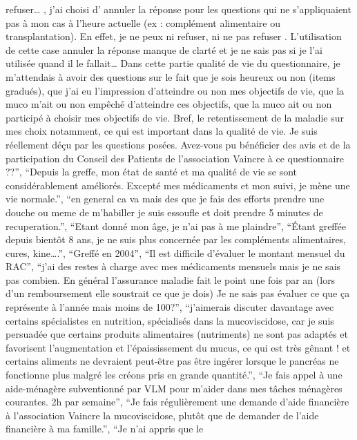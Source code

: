 \documentclass[
  letterpaper,
  DIV=11,
  numbers=noendperiod]{scrartcl}
\begin{document}
\begin{itemize}
  refuser\ldots{} , j'ai choisi d' annuler la réponse pour les questions
  qui ne s'appliquaient pas à mon cas à l'heure actuelle (ex :
  complément alimentaire ou transplantation). En effet, je ne peux ni
  refuser, ni ne pas refuser . L'utilisation de cette case annuler la
  réponse manque de clarté et je ne sais pas si je l'ai utilisée quand
  il le fallait\ldots{} Dans cette partie qualité de vie du
  questionnaire, je m'attendais à avoir des questions sur le fait que je
  sois heureux ou non (items gradués), que j'ai eu l'impression
  d'atteindre ou non mes objectifs de vie, que la muco m'ait ou non
  empêché d'atteindre ces objectifs, que la muco ait ou non participé à
  choisir mes objectifs de vie. Bref, le retentissement de la maladie
  sur mes choix notamment, ce qui est important dans la qualité de vie.
  Je suis réellement déçu par les questions posées. Avez-vous pu
  bénéficier des avis et de la participation du Conseil des Patients de
  l'association Vaincre à ce questionnaire ??'', ``Depuis la greffe, mon
  état de santé et ma qualité de vie se sont considérablement améliorés.
  Excepté mes médicaments et mon suivi, je mène une vie normale.'', ``en
  general ca va mais des que je fais des efforts prendre une douche ou
  meme de m'habiller je suis essoufle et doit prendre 5 minutes de
  recuperation.'', ``Etant donné mon âge, je n'ai pas à me plaindre'',
  ``Étant greffée depuis bientôt 8 ans, je ne suis plus concernée par
  les compléments alimentaires, cures, kine\ldots.'', ``Greffé en
  2004'', ``Il est difficile d'évaluer le montant mensuel du RAC'',
  ``j'ai des restes à charge avec mes médicaments mensuels mais je ne
  sais pas combien. En général l'assurance maladie fait le point une
  fois par an (lors d'un remboursement elle soustrait ce que je dois) Je
  ne sais pas évaluer ce que ça représente à l'année mais moins de
  100?'', ``j'aimerais discuter davantage avec certains spécialistes en
  nutrition, spécialisés dans la mucoviscidose, car je suis persuadée
  que certains produits alimentaires (nutriments) ne sont pas adaptés et
  favorisent l'augmentation et l'épaississement du mucus, ce qui est
  très gênant ! et certains aliments ne devraient peut-être pas être
  ingérer lorsque le pancréas ne fonctionne plus malgré les créons pris
  en grande quantité.'', ``Je fais appel à une aide-ménagère
  subventionné par VLM pour m'aider dans mes tâches ménagères courantes.
  2h par semaine'', ``Je fais régulièrement une demande d'aide
  financière à l'association Vaincre la mucoviscidose, plutôt que de
  demander de l'aide financière à ma famille.'', ``Je n'ai appris que le

\end{itemize}
\end{document}

